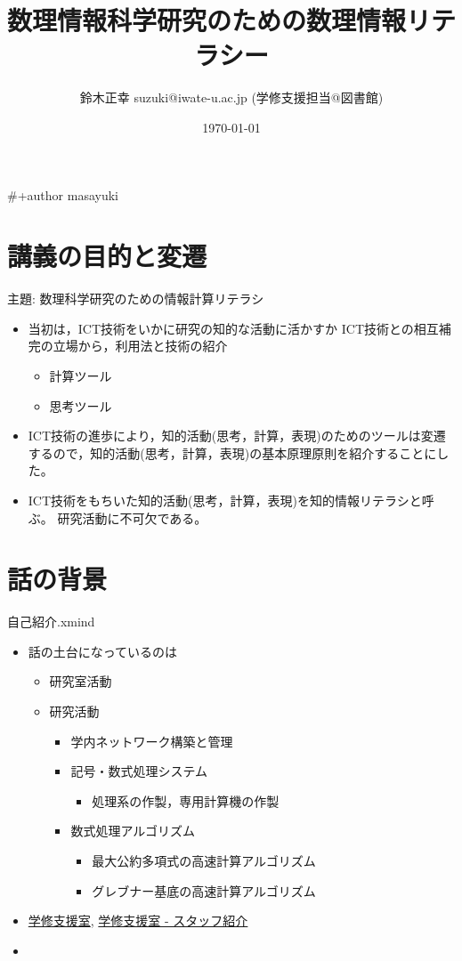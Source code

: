 \documentclass[dvipdfmx,11pat]{jarticle}
\author{鈴木正幸 suzuki@iwate-u.ac.jp (学修支援担当@図書館)}
\date{\today}
\title{ 数理情報科学研究のための数理情報リテラシー}
\begin{document}
\maketitle
\#+author masayuki
\section{講義の目的と変遷}
\label{sec:org4f70d1d}
主題: 数理科学研究のための情報計算リテラシ

\begin{itemize}
\item 当初は，ICT技術をいかに研究の知的な活動に活かすか
ICT技術との相互補完の立場から，利用法と技術の紹介
\begin{itemize}
\item 計算ツール
\item 思考ツール
\end{itemize}

\item ICT技術の進歩により，知的活動(思考，計算，表現)のためのツールは変遷
するので，知的活動(思考，計算，表現)の基本原理原則を紹介することにし
た。

\item ICT技術をもちいた知的活動(思考，計算，表現)を知的情報リテラシと呼ぶ。
研究活動に不可欠である。
\end{itemize}
\section{話の背景}
\label{sec:org8494541}
自己紹介.xmind
\begin{itemize}
\item 話の土台になっているのは
\begin{itemize}
\item 研究室活動
\item 研究活動
\begin{itemize}
\item 学内ネットワーク構築と管理
\item 記号・数式処理システム
\begin{itemize}
\item 処理系の作製，専用計算機の作製
\end{itemize}
\item 数式処理アルゴリズム
\begin{itemize}
\item 最大公約多項式の高速計算アルゴリズム
\item グレブナー基底の高速計算アルゴリズム
\end{itemize}
\end{itemize}
\end{itemize}
\item \href{https://sites.google.com/iwate-u.ac.jp/lsr/index?authuser=0}{学修支援室}, \href{https://sites.google.com/iwate-u.ac.jp/lsr/staff?authuser=0}{学修支援室 - スタッフ紹介}
\item 
\end{itemize}
\end{document}
